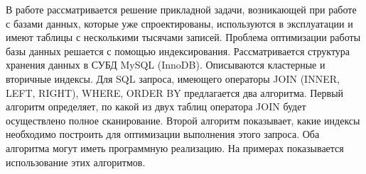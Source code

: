 \Introduction

В работе рассматривается решение прикладной задачи, возникающей при работе с базами данных, которые уже спроектированы, используются в эксплуатации и имеют таблицы с несколькими тысячами записей. Проблема оптимизации работы базы данных решается с помощью индексирования. Рассматривается структура хранения данных в СУБД MySQL (InnoDB). Описываются кластерные и вторичные индексы. Для SQL запроса, имеющего операторы JOIN (INNER, LEFT, RIGHT), WHERE, ORDER BY предлагается два алгоритма. Первый алгоритм определяет, по какой из двух таблиц оператора JOIN будет осуществлено полное сканирование. Второй алгоритм показывает, какие индексы необходимо построить для оптимизации выполнения этого запроса. Оба алгоритма могут иметь программную реализацию. На примерах показывается использование этих алгоритмов. 